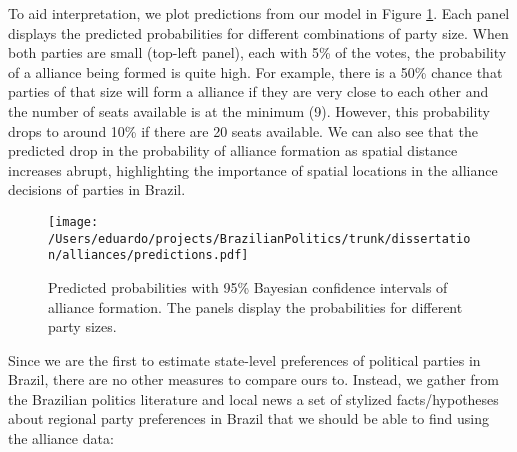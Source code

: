To aid interpretation, we plot predictions from our model in Figure \ref{fig:strucpred}. Each panel displays the predicted probabilities for different combinations of party size. When both parties are small (top-left panel), each with 5\% of the votes, the probability of a alliance being formed is quite high. For example, there is a 50\% chance that parties of that size  will form a alliance if they are very close to each other and the number of seats available is at the minimum (9). However, this probability drops to around 10\% if there are 20 seats available. We can also see that the predicted drop in the probability of alliance formation as spatial distance increases  abrupt, highlighting the importance of spatial locations in the alliance decisions of parties in Brazil.

\begin{figure}
  \centering
  \texttt{[image: /Users/eduardo/projects/BrazilianPolitics/trunk/dissertation/alliances/predictions.pdf]} 
  \caption{Predicted probabilities with 95\% Bayesian confidence intervals of alliance formation. The panels display the probabilities for different party sizes.  }
  \label{fig:strucpred}
\end{figure}

Since we are  the first to estimate state-level preferences of political parties in Brazil,  there are no other measures to compare ours to. Instead, we gather from the Brazilian politics literature and local news a set of  stylized facts/hypotheses about regional party preferences in Brazil that we should be able to find using the alliance data:

